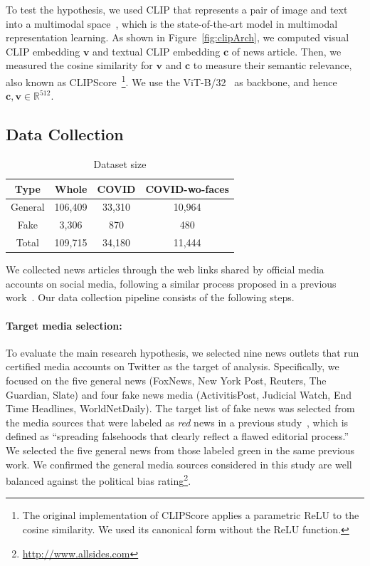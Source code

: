 \documentclass[11pt]{article}
\begin{document}
To test the hypothesis, we used CLIP that represents a pair of image and text into a multimodal space~\cite{radford2021learning}, which is the state-of-the-art model in multimodal representation learning.
As shown in Figure~\ref{fig:clipArch}, we computed visual CLIP embedding $\mathbf{v}$ and textual CLIP embedding $\mathbf{c}$ of news article. Then, we measured the cosine similarity for $\mathbf{v}$ and $\mathbf{c}$ to measure their semantic relevance, also known as CLIPScore~\cite{hessel2021clipscore}\footnote{The original implementation of CLIPScore applies a parametric ReLU to the cosine similarity. We used its canonical form without the ReLU function.}.
We use the ViT-B/32~\cite{DBLP:journals/corr/abs-2010-11929} as backbone, and hence $\mathbf{c},\mathbf{v}\in \mathbb{R}^{512}$.

\subsection{Data Collection}

\begin{table}[ht]
\centering
\small
\begin{tabular}{c|ccc}
\toprule
\textbf{Type} & \multicolumn{1}{c}{\textbf{Whole}} & \multicolumn{1}{c}{\textbf{COVID}} & \multicolumn{1}{c}{\textbf{COVID-wo-faces}} \\ \midrule
General & 106,409  & 33,310 & 10,964  \\
Fake    &  3,306    & 870 & 480   \\ 
\midrule
Total   & 109,715  &  34,180  & 11,444 \\
\bottomrule
\end{tabular}
\caption{Dataset size} 
\label{tab:table1}
\end{table}

We collected news articles through the web links shared by official media accounts on social media, following a similar process proposed in a previous work~\cite{park2021present}. Our data collection pipeline consists of the following steps. 

\paragraph{Target media selection:}
To evaluate the main research hypothesis, we selected nine news outlets that run certified media accounts on Twitter as the target of analysis. Specifically, we focused on the five general news (FoxNews, New York Post, Reuters, The Guardian, Slate) and four fake news media (ActivitisPost, Judicial Watch, End Time Headlines, WorldNetDaily). The target list of fake news was selected from the media sources that were labeled as \textit{red} news in a previous study~\cite{doi:10.1126/science.aau2706}, which is defined as ``spreading falsehoods that clearly reflect a flawed editorial process.'' We selected the five general news from those labeled green in the same previous work. We confirmed the general media sources considered in this study are well balanced against the political bias rating\footnote{\url{http://www.allsides.com}}. 
 
\end{document}
